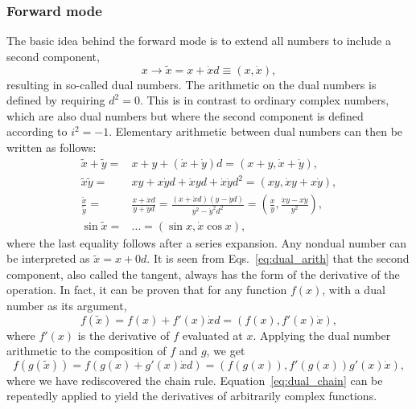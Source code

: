\documentclass{article}
\begin{document}
\subsubsection{Forward mode}

The basic idea behind the forward mode is to extend all numbers to
include a second component,
\begin{equation}
  \label{eq:ddouble}
  x \rightarrow \tilde x = x + \dot x d \equiv (x,\dot x),
\end{equation}
resulting in so-called dual numbers. The arithmetic on the dual
numbers is defined by requiring $d^2=0$. This is in contrast to
ordinary complex numbers, which are also dual numbers but where the
second component is defined according to $i^2=-1$. Elementary
arithmetic between dual numbers can then be written as follows:
\begin{equation}
  \label{eq:dual_arith}
  \begin{split}
    \tilde x + \tilde y =& x + y + (\dot x + \dot y)d = (x+y, \dot x +
    \dot y), \\
    \tilde x\tilde y =& xy + x\dot yd + \dot xyd + \dot x\dot yd^2 =
    (xy, \dot xy + x\dot y), \\
    \frac{\tilde x}{\tilde y} =& \frac{x + \dot xd}{y + \dot yd} =
    \frac{(x + \dot xd)(y - \dot yd)}{y^2 - \dot y^2 d^2} =
    \left(\frac{x}{y}, \frac{\dot xy - x\dot y}{y^2} \right), \\
    \sin\tilde x =& \ldots = (\sin x, \dot x\cos x),
  \end{split}
\end{equation}
where the last equality follows after a series expansion. Any nondual
number can be interpreted as $\tilde x=x+0d$. It is seen from
Eqs.~\eqref{eq:dual_arith} that the second component, also called the
tangent, always has the form of the derivative of the operation. In
fact, it can be proven that for any function $f(x)$, with a dual
number as its argument,
\begin{equation}
  \label{eq:dual_general}
  f(\tilde x) = f(x) + f'(x)\dot xd = \left( f(x), f'(x)\dot x
  \right),
\end{equation}
where $f'(x)$ is the derivative of $f$ evaluated at $x$. Applying the
dual number arithmetic to the composition of $f$ and $g$, we get
\begin{equation}
  \label{eq:dual_chain}
  f(g(\tilde x)) = f(g(x) + g'(x)\dot xd) = \left( f(g(x)),
    f'(g(x))g'(x)\dot x \right),
\end{equation}
where we have rediscovered the chain
rule. Equation~\eqref{eq:dual_chain} can be repeatedly applied to
yield the derivatives of arbitrarily complex functions.
\end{document}
